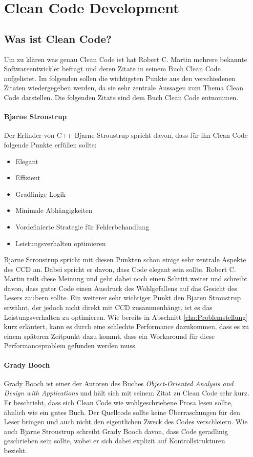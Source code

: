 \chapter{Clean Code Development}
\section{Was ist Clean Code?}
Um zu klären was genau Clean Code ist hat Robert C. Martin mehrere bekannte Softwareentwickler befragt und deren Zitate in seinem Buch Clean Code \cite{Martin2008} aufgelistet. Im folgenden sollen die wichtigsten Punkte aus den verschiedenen Zitaten wiedergegeben werden, da sie sehr zentrale Aussagen zum Thema Clean Code darstellen. Die folgenden Zitate sind dem Buch Clean Code \cite{Martin2008} entnommen.

\subsubsection{Bjarne Stroustrup}
Der Erfinder von C++ Bjarne Stroustrup spricht davon, dass für ihn Clean Code folgende Punkte erfüllen sollte:

\begin{itemize}
	\item Elegant
	\item Effizient
	\item Gradlinige Logik
	\item Minimale Abhängigkeiten
	\item Vordefinierte Strategie für Fehlerbehandlung
	\item Leistungsverhalten optimieren
\end{itemize}

Bjarne Stroustrup spricht mit diesen Punkten schon einige sehr zentrale Aspekte des CCD an. Dabei spricht er davon, dass Code elegant sein sollte. Robert C. Martin teilt diese Meinung und geht dabei noch einen Schritt weiter und schreibt davon, dass guter Code einen Ausdruck des Wohlgefallens auf das Gesicht des Lesers zaubern sollte. Ein weiterer sehr wichtiger Punkt den Bjaren Stroustrup erwähnt, der jedoch nicht direkt mit CCD zusammenhängt, ist es das Leistungsverhalten zu optimieren. Wie bereits in Abschnitt \ref{cha:Problemstellung} kurz erläutert, kann es durch eine schlechte Performance dazukommen, dass es zu einem späteren Zeitpunkt dazu kommt, dass ein Workaround für diese Performanceproblem gefunden werden muss.

\subsubsection{Grady Booch}
Grady Booch ist einer der Autoren des Buches \textit{Object-Oriented Analysis and Design with Applications} \cite{Booch2004} und hält sich mit seinem Zitat zu Clean Code sehr kurz. Er beschriebt, dass sich Clean Code wie wohlgeschriebene Prosa lesen sollte, ähnlich wie ein gutes Buch. Der Quellcode sollte keine Überraschungen für den Leser bringen und auch nicht den eigentlichen Zweck des Codes verschleiern. Wie auch Bjarne Stroustrup schreibt Grady Booch davon, dass Code geradlinig geschrieben sein sollte, wobei er sich dabei explizit auf Kontrollstrukturen bezieht.

